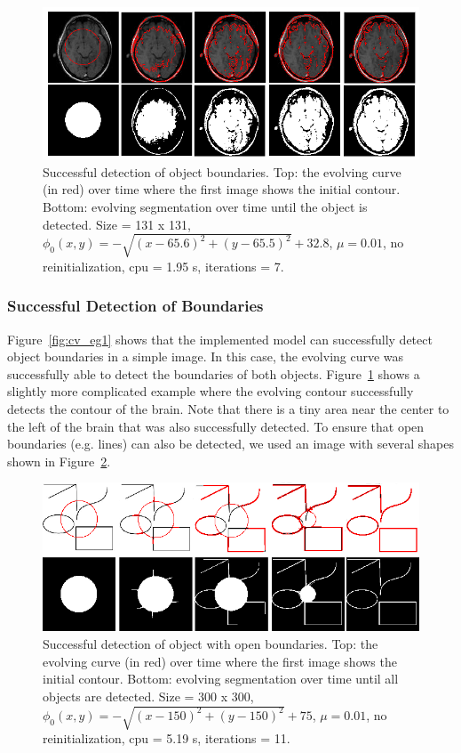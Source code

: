 \documentclass[10pt,twocolumn,letterpaper]{article}
\begin{document}
\begin{figure}[t]
\centering
\includegraphics[width=12cm]{cv_eg2.png}
\caption{Successful detection of object boundaries. Top: the evolving curve (in red) over time where the first image shows the initial contour.
Bottom: evolving segmentation over time until the object is detected. Size = 131 x 131, $\phi_{0}(x,y) = - \sqrt{(x - 65.6)^2 + (y - 65.5)^2} + 32.8$, $\mu =
0.01$, no reinitialization, cpu = 1.95 s, iterations = 7.}
\label{fig:cv_eg2}
\end{figure}

\subsubsection*{Successful Detection of Boundaries}

Figure~\ref{fig:cv_eg1} shows that the implemented model can successfully detect object boundaries in a simple image. In this case, the evolving curve was
successfully able to detect the boundaries of both objects. Figure~\ref{fig:cv_eg2} shows a slightly more complicated example where the evolving contour
successfully detects the contour of the brain. Note that there is a tiny area near the center to the left of the brain that was also successfully detected. To
ensure
that open boundaries (e.g. lines) can also be detected, we used an image with several shapes shown in Figure~\ref{fig:cv_eg8}.

\begin{figure}[t]
\centering
\includegraphics[width=12cm]{cv_eg8.png}
\caption{Successful detection of object with open boundaries. Top: the evolving curve (in red) over time where the first image shows the initial contour.
Bottom: evolving segmentation over time until all objects are detected. Size = 300 x 300, $\phi_{0}(x,y) = - \sqrt{(x - 150)^2 + (y - 150)^2} + 75$, $\mu =
0.01$, no reinitialization, cpu = 5.19 s, iterations = 11.}
\label{fig:cv_eg8}
\end{figure}
\end{document}
